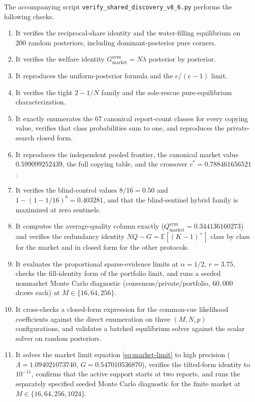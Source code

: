 \documentclass[11pt]{article}
\theoremstyle{definition}
\theoremstyle{remark}
\newcommand{\E}{\mathbb{E}}
\newcommand{\1}{\mathbf{1}}
\newcommand{\mkt}{\mathrm{market}}
\begin{document}
The accompanying script \texttt{verify\_shared\_discovery\_v8\_6.py} performs the following checks.

\begin{enumerate}
\item It verifies the reciprocal-share identity and the water-filling equilibrium on $200$ random posteriors, including dominant-posterior pure corners.
\item It verifies the welfare identity $G_{\mkt}^{\mathrm{sym}}=N\lambda$ posterior by posterior.
\item It reproduces the uniform-posterior formula and the $e/(e-1)$ limit.
\item It verifies the tight $2-1/N$ family and the sole-rescue pure-equilibrium characterization.
\item It exactly enumerates the $67$ canonical report-count classes for every copying value, verifies that class probabilities sum to one, and reproduces the private-search closed form.
\item It reproduces the independent pooled frontier, the canonical market value $0.599099252439$, the full copying table, and the crossover $c^*=0.788461656521$.
\item It verifies the blind-control values $8/16=0.50$ and $1-(1-1/16)^8=0.403281$, and that the blind-sentinel hybrid family is maximized at zero sentinels.
\item It computes the average-quality column exactly ($Q_{\mkt}^{\mathrm{sym}}=0.344136160273$) and verifies the redundancy identity $NQ-G=\E[(K-1)^{+}]$ class by class for the market and in closed form for the other protocols.
\item It evaluates the proportional sparse-evidence limits at $\alpha=1/2$, $r=3.75$, checks the fill-identity form of the portfolio limit, and runs a seeded nonmarket Monte Carlo diagnostic (consensus/private/portfolio, $60{,}000$ draws each) at $M\in\{16,64,256\}$.
\item It cross-checks a closed-form expression for the common-cue likelihood coefficients against the direct enumeration on three $(M,N,p)$ configurations, and validates a batched equilibrium solver against the scalar solver on random posteriors.
\item It solves the market limit equation \cref{eq:market-limit} to high precision ($\Lambda=1.094021073740$, $G=0.547010536870$), verifies the tilted-form identity to $10^{-11}$, confirms that the active support starts at two reports, and runs the separately specified seeded Monte Carlo diagnostic for the finite market at $M\in\{16,64,256,1024\}$.

\end{enumerate}
\end{document}

